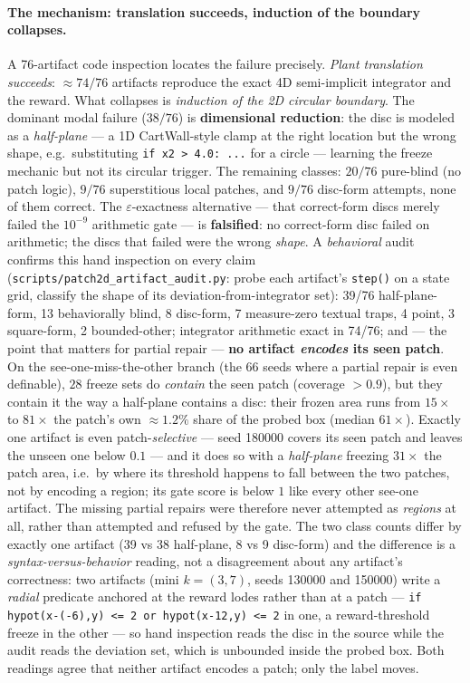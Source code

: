 \documentclass[11pt]{article}
\theoremstyle{definition}
\theoremstyle{remark}
\begin{document}
\paragraph{The mechanism: translation succeeds, induction of the boundary collapses.} A 76-artifact code inspection locates the failure precisely. \emph{Plant translation succeeds}: ${\approx}74/76$ artifacts reproduce the exact 4D semi-implicit integrator and the reward. What collapses is \emph{induction of the 2D circular boundary}. The dominant modal failure ($38/76$) is \textbf{dimensional reduction}: the disc is modeled as a \emph{half-plane} --- a 1D CartWall-style clamp at the right location but the wrong shape, e.g.\ substituting \texttt{if x2 > 4.0: ...} for a circle --- learning the freeze mechanic but not its circular trigger. The remaining classes: $20/76$ pure-blind (no patch logic), $9/76$ superstitious local patches, and $9/76$ disc-form attempts, none of them correct. The $\varepsilon$-exactness alternative --- that correct-form discs merely failed the $10^{-9}$ arithmetic gate --- is \textbf{falsified}: no correct-form disc failed on arithmetic; the discs that failed were the wrong \emph{shape}. A \emph{behavioral} audit confirms this hand inspection on every claim (\texttt{scripts/patch2d\_artifact\_audit.py}: probe each artifact's \texttt{step()} on a state grid, classify the shape of its deviation-from-integrator set): 39/76 half-plane-form, 13 behaviorally blind, 8 disc-form, 7 measure-zero textual traps, 4 point, 3 square-form, 2 bounded-other; integrator arithmetic exact in 74/76; and --- the point that matters for partial repair --- \textbf{no artifact \emph{encodes} its seen patch}. On the see-one-miss-the-other branch (the 66 seeds where a partial repair is even definable), $28$ freeze sets do \emph{contain} the seen patch (coverage $>0.9$), but they contain it the way a half-plane contains a disc: their frozen area runs from $15\times$ to $81\times$ the patch's own ${\approx}1.2\%$ share of the probed box (median $61\times$). Exactly one artifact is even patch-\emph{selective} --- seed 180000 covers its seen patch and leaves the unseen one below $0.1$ --- and it does so with a \emph{half-plane} freezing $31\times$ the patch area, i.e.\ by where its threshold happens to fall between the two patches, not by encoding a region; its gate score is below $1$ like every other see-one artifact. The missing partial repairs were therefore never attempted as \emph{regions} at all, rather than attempted and refused by the gate. The two class counts differ by exactly one artifact (39 vs 38 half-plane, 8 vs 9 disc-form) and the difference is a \emph{syntax-versus-behavior} reading, not a disagreement about any artifact's correctness: two artifacts (mini $k=(3,7)$, seeds 130000 and 150000) write a \emph{radial} predicate anchored at the reward lodes rather than at a patch --- \texttt{if hypot(x{-}(-6),y) <= 2 or hypot(x{-}12,y) <= 2} in one, a reward-threshold freeze in the other --- so hand inspection reads the disc in the source while the audit reads the deviation set, which is unbounded inside the probed box. Both readings agree that neither artifact encodes a patch; only the label moves.
\end{document}

